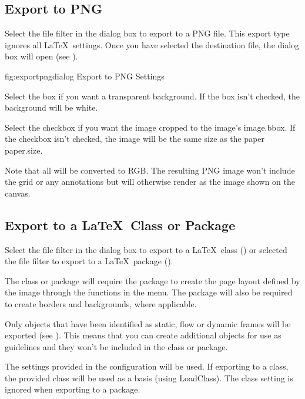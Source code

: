 \subsection{Export to PNG}\label{sec:exportpng}

Select the  file filter in the
 dialog box to export to a PNG file. This export type
ignores all \LaTeX\ settings. Once you have selected the destination
 file, the 
dialog box will open (see ).

\FloatFig
  {fig:exportpngdialog}
  {}
  {Export to PNG Settings}

Select the  box if you want a transparent
background. If the box isn't checked, the background will be white.

Select the  checkbox if you want the image cropped
to the image's \gls{image.bbox}. If the checkbox isn't checked, the image
will be the same size as the paper \gls{paper.size}. 

Note that all  will be converted to RGB.
The resulting PNG image won't include the grid or any annotations
but will otherwise render as the image shown on the \gls{canvas}.

\subsection{Export to a \LaTeX\ Class or Package}\label{sec:exportsty}

Select the  file filter in the
 dialog box to export to a \LaTeX\ class
() or selected the 
file filter to export to a \LaTeX\ package ().

The class or package will require the  package to
create the page layout defined by the image through the functions in
the  menu.  The  package will also be
required to create borders and backgrounds, where applicable.

Only \glspl{object} that have been identified as static, flow or
dynamic frames will be exported (see ).
This means that you can create additional \glspl{object} for use as
guidelines and they won't be included in the class or package.

The settings provided in the  configuration
will be used. If exporting to a class, the provided class will be
used as a basis (using \gls{LoadClass}). The class setting is
ignored when exporting to a package.

